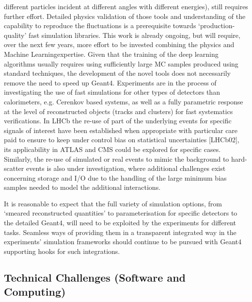 \documentclass[11pt,a4paper]{article}
\begin{document}
different particles incident at different angles with different
energies), still requires further effort. Detailed physics validation of
those tools and understanding of the capability to reproduce the
fluctuations is a prerequisite towards `production-quality' fast
simulation libraries. This work is already ongoing, but will require,
over the next few years, more effort to be invested combining the
physics and Machine Learningexpertise. Given that the training of the
deep learning algorithms usually requires using sufficiently large MC
samples produced using standard techniques, the development of the novel
tools does not necessarily remove the need to speed up Geant4.
Experiments are in the process of investigating the use of fast
simulations for other types of detectors than calorimeters, e.g.
Cerenkov based systems, as well as a fully parametric response at the
level of reconstructed objects (tracks and clusters) for fast
systematics verifications. In LHCb the re-use of part of the underlying
events for specific signals of interest have been established when
appropriate with particular care paid to ensure to keep under control
bias on statistical uncertainties {[}LHCb02{]}, its applicability in
ATLAS and CMS could be explored for specific cases. Similarly, the
re-use of simulated or real events to mimic the background to
hard-scatter events is also under investigation, where additional
challenges exist concerning storage and I/O due to the handling of the
large minimum bias samples needed to model the additional interactions.

It is reasonable to expect that the full variety of simulation options,
from `smeared reconstructed quantities' to parameterisation for specific
detectors to the detailed Geant4, will need to be exploited by the
experiments for different tasks. Seamless ways of providing them in a
transparent integrated way in the experiments' simulation frameworks
should continue to be pursued with Geant4 supporting hooks for such
integrations.

\hypertarget{technical-challenges-software-and-computing-1}{%
\subsection{Technical Challenges (Software and
Computing)}\label{technical-challenges-software-and-computing-1}}
\end{document}

